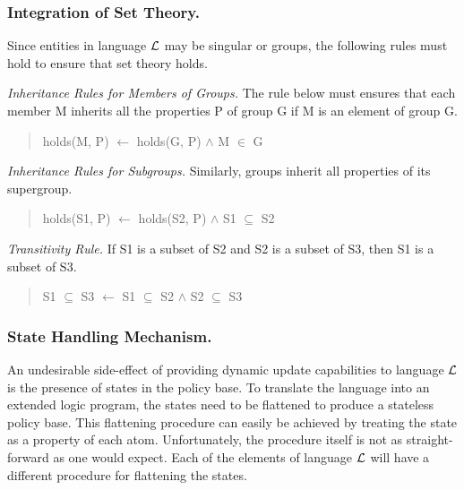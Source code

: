 \documentclass{llncs}
\begin{document}
      \subsubsection{Integration of Set Theory.}

        Since entities in language $\cal{L}$ may be singular or groups,
        the following rules must hold to ensure that set theory holds.

        \emph{Inheritance Rules for Members of Groups.} The rule below must
        ensures that each member M inherits all the properties P of group G if
        M is an element of group G.

        \begin{quote}
          holds(M, P) $\leftarrow$ holds(G, P) $\land$ M $\in$ G
        \end{quote}

        \emph{Inheritance Rules for Subgroups.} Similarly, groups inherit all
        properties of its supergroup.

        \begin{quote}
          holds(S1, P) $\leftarrow$ holds(S2, P) $\land$ S1 $\subseteq$ S2
        \end{quote}

        \emph{Transitivity Rule.} If S1 is a subset of S2 and S2 is a subset
        of S3, then S1 is a subset of S3.

        \begin{quote}
          S1 $\subseteq$ S3 $\leftarrow$ S1 $\subseteq$ S2 $\land$ S2
          $\subseteq$ S3
        \end{quote}

      \subsubsection{State Handling Mechanism.}

        An undesirable side-effect of providing dynamic update capabilities to
        language $\cal{L}$ is the presence of states in the policy base. To
        translate the language into an extended logic program, the states need
        to be flattened to produce a stateless policy base. This flattening
        procedure can easily be achieved by treating the state as a property
        of each atom. Unfortunately, the procedure itself is not as straight-
        forward as one would expect. Each of the elements of language $\cal{L}$
        will have a different procedure for flattening the states.
\end{document}
